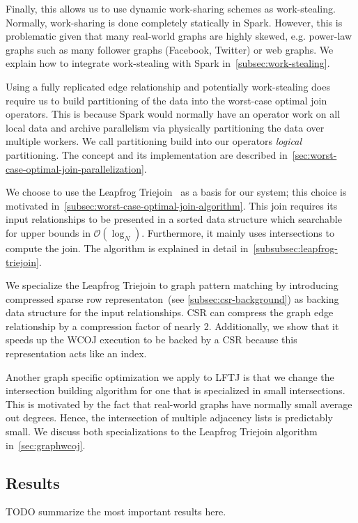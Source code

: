 Finally, this allows us to use dynamic work-sharing schemes as work-stealing.
Normally, work-sharing is done completely statically in Spark.
However, this is problematic given that many real-world graphs are highly skewed, e.g. power-law graphs such as many follower graphs
(Facebook, Twitter) or web graphs.
We explain how to integrate work-stealing with Spark in~\cref{subsec:work-stealing}.

Using a fully replicated edge relationship and potentially work-stealing does require us to build partitioning of the data into the
worst-case optimal join operators.
This is because Spark would normally have an operator work on all local data and archive parallelism via physically partitioning the
data over multiple workers.
We call partitioning build into our operators \textit{logical} partitioning.
The concept and its implementation are described in~\cref{sec:worst-case-optimal-join-parallelization}.

We choose to use the Leapfrog Triejoin~\cite{lftj} as a basis for our system;
this choice is motivated in~\cref{subsec:worst-case-optimal-join-algorithm}.
This join requires its input relationships to be presented in a sorted data structure which searchable for upper bounds in
$\mathcal{O} (\log_N)$.
Furthermore, it mainly uses intersections to compute the join.
The algorithm is explained in detail in~\cref{subsubsec:leapfrog-triejoin}.

We specialize the Leapfrog Triejoin to graph pattern matching by introducing compressed sparse row representaton~(see
\cref{subsec:csr-background}) as backing data structure for the input relationships.
\textsc{CSR} can compress the graph edge relationship by a compression factor of nearly 2.
Additionally, we show that it speeds up the \textsc{WCOJ} execution to be backed by a \textsc{CSR} because this representation
acts like an index.

Another graph specific optimization we apply to \textsc{LFTJ} is that we change the intersection building algorithm for one
that is specialized in small intersections.
This is motivated by the fact that real-world graphs have normally small average out degrees.
Hence, the intersection of multiple adjacency lists is predictably small.
We discuss both specializations to the Leapfrog Triejoin algorithm in~\cref{sec:graphwcoj}.

\subsection{Results} \label{subsec:introduction-results}
TODO summarize the most important results here.

